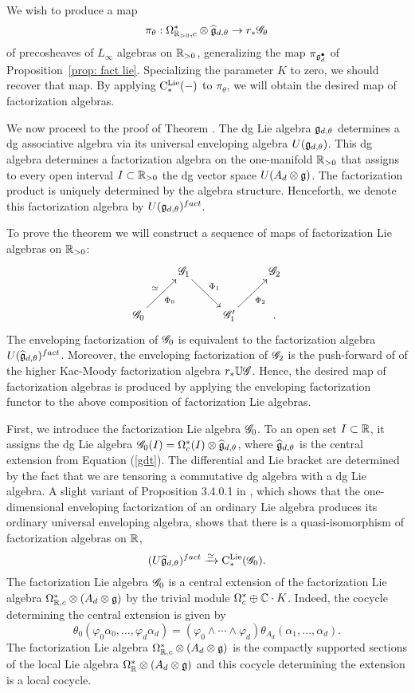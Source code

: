 
We wish to produce a map 
\[
\pi_\theta: \Omega^*_{\mathbb R_{>0},c} \otimes \widehat{\mathfrak g}_{d,\theta} \to r_* \mathscr G_\theta
\]
of precosheaves of $L_\infty$ algebras on $\mathbb R_{>0}$,
generalizing the map $\pi_{\mathfrak g^\bullet_d}$ of Proposition~\ref{prop: fact lie}.
Specializing the parameter $K$ to zero, we should recover that map.
By applying ${\rm C}^{\rm Lie}_*(-)$ to $\pi_\theta$, we will obtain the desired map of factorization algebras. 

We now proceed to the proof of Theorem \label{thm sphere alg}. 
The dg Lie algebra $\mathfrak g_{d,\theta}$ determines a dg associative algebra via its universal enveloping algebra $U(\mathfrak g_{d,\theta})$.
This dg algebra determines a factorization algebra on the one-manifold $\mathbb R_{>0}$ that assigns to every open interval $I \subset \mathbb R_{>0}$ the dg vector space $U(A_d \otimes \mathfrak g)$. 
The factorization product is uniquely determined by the algebra structure. 
Henceforth, we denote this factorization algebra by $U(\mathfrak g_{d,\theta})^{fact}$.

To prove the theorem we will construct a sequence of maps of factorization Lie algebras on $\mathbb R_{>0}$:
\[
\xymatrix{
& \sG_1 \ar[dr]^-{\Phi_1} & & \sG_2 \\
\sG_0 \ar[ur]^-{\simeq}_{\Phi_0} & & \sG_1' \ar[ur]_{\Phi_2} & .
}
\]
The enveloping factorization of $\mathscr G_0$ is equivalent to the factorization algebra $U (\widehat{\mathfrak g}_{d,\theta})^{fact}$. 
Moreover, the enveloping factorization of $\mathscr G_2$ is the push-forward of of the higher Kac-Moody factorization algebra $r_* \mathbb U \mathscr G$. 
Hence, the desired map of factorization algebras is produced by applying the enveloping factorization functor to the above composition of factorization Lie algebras. 

First, we introduce the factorization Lie algebra $\mathscr G_0$. 
To an open set $I \subset \mathbb R$, it assigns the dg Lie algebra $\mathscr G_0(I) = \Omega^*_{c}(I) \otimes \widehat{\mathfrak g}_{d,\theta}$, where $\widehat{\mathfrak g}_{d,\theta}$ is the central extension from Equation (\ref{gdt}). The differential and Lie bracket are determined by the fact that we are tensoring a commutative dg algebra with a dg Lie algebra. A slight variant of Proposition 3.4.0.1 in \cite{CG1}, which shows that the one-dimensional enveloping factorization of an ordinary Lie algebra produces its ordinary universal enveloping algebra, shows that there is a quasi-isomorphism of factorization algebras on $\mathbb R$,
\[
(U \widehat{\mathfrak g}_{d,\theta})^{fact} \xrightarrow{\simeq} {\rm C}^{\rm Lie}_*(\mathscr G_0) .
\]
The factorization Lie algebra $\mathscr G_0$ is a central extension of the factorization Lie algebra $\Omega^*_{\mathbb R,c} \otimes (A_d \otimes \mathfrak g)$ by the trivial module $\Omega^*_c \oplus \mathbb C \cdot K$. Indeed, the cocycle determining the central extension is given by
\[
\theta_0 (\varphi_0 \alpha_0,\ldots,\varphi_d \alpha_d) = (\varphi_0 \wedge \cdots \wedge \varphi_d) \theta_{A_d}(\alpha_1,\ldots,\alpha_d) .
\] 
The factorization Lie algebra $\Omega^*_{\mathbb R,c} \otimes (A_d \otimes \mathfrak g)$ is the compactly supported sections of the local Lie algebra $\Omega^*_{\mathbb R} \otimes (A_d \otimes \mathfrak g)$ and this cocycle determining the extension is a local cocycle. 

